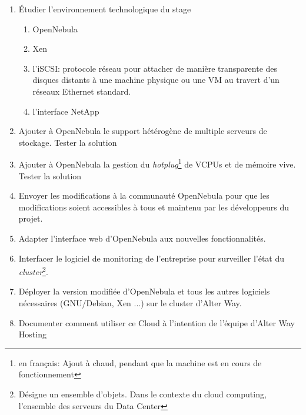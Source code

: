 \begin{enumerate}
	\item Étudier l'environnement technologique du stage
		\begin{enumerate}
		\item OpenNebula
		\item Xen
		\item l'iSCSI: protocole réseau pour attacher de manière transparente des disques distants à une machine physique ou une VM
			au travert d'un réseaux Ethernet standard.
		\item l'interface NetApp
		\end{enumerate}
	\item Ajouter à OpenNebula le support hétérogène de multiple serveurs de stockage.
		\subitem Tester la solution
	\item Ajouter à OpenNebula la gestion du \emph{hotplug}\footnote{en français: Ajout à chaud, pendant que la machine est en cours de fonctionnement}
		de VCPUs et de mémoire vive.
		\subitem Tester la solution
	\item Envoyer les modifications à la communauté OpenNebula pour que les modifications soient accessibles à tous et maintenu par les développeurs du projet.
	\item Adapter l'interface web d'OpenNebula aux nouvelles fonctionnalités.
	\item Interfacer le logiciel de monitoring de l'entreprise pour surveiller l'état du \emph{cluster}\footnote{Désigne un ensemble d'objets. Dans le contexte
	du cloud computing, l'ensemble des serveurs du Data Center}.
	\item Déployer la version modifiée d'OpenNebula et tous les autres logiciels nécessaires (GNU/Debian, Xen ...) sur le cluster d'Alter Way.
	\item Documenter comment utiliser ce Cloud à l'intention de l'équipe d'Alter Way Hosting
\end{enumerate}

